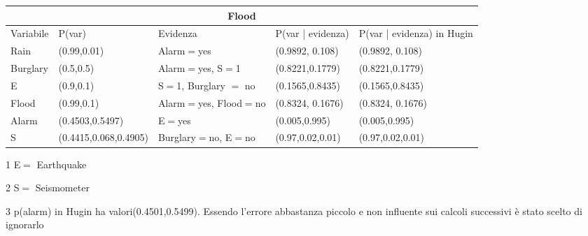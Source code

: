 \documentclass{report}
\begin{document}
\newpage
\begin{table}[hbt!]
\small
\hskip-1.0cm\begin{threeparttable}
\begin{tabular}{ |p{2cm}||p{3cm}|p{2cm}|p{3cm}|p{3cm}|  }
\hline
 \multicolumn{5}{|c|}{Flood} \\
 \hline
Variabile & P(var) & Evidenza & P(var | evidenza) & P(var | evidenza)  in Hugin\\
 \hline
Rain &(0.99,0.01) & Alarm$=$yes & (0.9892, 0.108) &(0.9892, 0.108)\\
\hline
Burglary & (0.5,0.5) & Alarm$=$yes, S$=$1 & (0.8221,0.1779)& (0.8221,0.1779)\\
\hline
E & (0.9,0.1) & S$=$1, Burglary $=$ no & (0.1565,0.8435) & (0.1565,0.8435)\\
\hline
Flood & (0.99,0.1) & Alarm$=$yes, Flood$=$no & (0.8324, 0.1676) & (0.8324, 0.1676)\\
\hline
Alarm & (0.4503,0.5497) & E$=$yes& (0.005,0.995) & (0.005,0.995)\\
\hline
S & (0.4415,0.068,0.4905) & Burglary$=$no, E$=$no & (0.97,0.02,0.01) &(0.97,0.02,0.01)\\
\hline
\end{tabular}
\begin{tablenotes}
 	    \item[1] E$=$ Earthquake 
        \item[2] S$=$ Seismometer
        \item[3] p(alarm) in Hugin ha valori(0.4501,0.5499). Essendo l'errore abbastanza piccolo e non influente sui calcoli successivi è stato scelto di ignorarlo
 \end{tablenotes}
\end{threeparttable}
\end{table}
\end{document}
